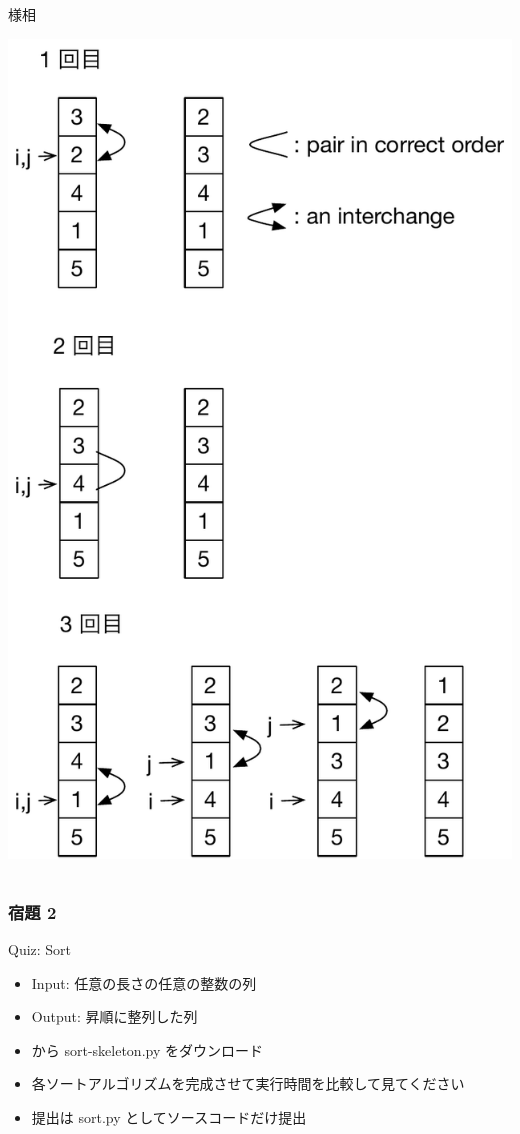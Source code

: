 \begin{frame}
\begin{columns}[t,onlytextwidth]
\begin{column}{0.55\linewidth}{様相}
\begin{center}
\includegraphics[scale=0.3]{./Figure/insertion_sort.pdf}
      \end{center}
    \end{column}
  \end{columns}
\end{frame}
\begin{frame}[shrink]
\frametitle{宿題 2 }
  \begin{block}{Quiz: Sort}
\scriptsize
    \begin{itemize}
\item Input: 任意の長さの任意の整数の列
\item Output: 昇順に整列した列
\item \href{https://sites.google.com/presystems.xyz/elementaryCS/}{} から sort-skeleton.py をダウンロード
\item 各ソートアルゴリズムを完成させて実行時間を比較して見てください
\item 提出は sort.py としてソースコードだけ提出
    \end{itemize}
  \end{block}
\end{frame}
